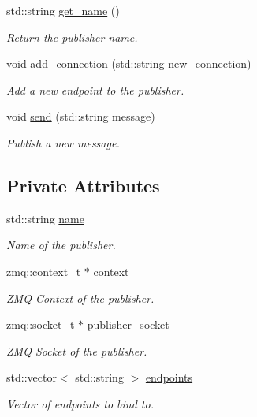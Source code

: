 \begin{DoxyCompactItemize}
std\+::string \hyperlink{classzcm_1_1Publisher_adc12b48e001014854e35141457d5c90d}{get\+\_\+name} ()
\begin{DoxyCompactList}\small\item\em Return the publisher name. \end{DoxyCompactList}\item 
void \hyperlink{classzcm_1_1Publisher_aa581fdeacd01dca767c2c1d0e3e4031f}{add\+\_\+connection} (std\+::string new\+\_\+connection)
\begin{DoxyCompactList}\small\item\em Add a new endpoint to the publisher. \end{DoxyCompactList}\item 
void \hyperlink{classzcm_1_1Publisher_a1e72bb0eef5a99fdbec0e2df957668e0}{send} (std\+::string message)
\begin{DoxyCompactList}\small\item\em Publish a new message. \end{DoxyCompactList}\end{DoxyCompactItemize}
\subsection*{Private Attributes}
\begin{DoxyCompactItemize}
\item 
std\+::string \hyperlink{classzcm_1_1Publisher_a2e3902339b55647dc6a7d2f3de64d8fe}{name}
\begin{DoxyCompactList}\small\item\em Name of the publisher. \end{DoxyCompactList}\item 
zmq\+::context\+\_\+t $\ast$ \hyperlink{classzcm_1_1Publisher_a399965216cd17f1097313f044487d968}{context}
\begin{DoxyCompactList}\small\item\em Z\+MQ Context of the publisher. \end{DoxyCompactList}\item 
zmq\+::socket\+\_\+t $\ast$ \hyperlink{classzcm_1_1Publisher_acb22f36a592a5a0beaf4100e472578d5}{publisher\+\_\+socket}
\begin{DoxyCompactList}\small\item\em Z\+MQ Socket of the publisher. \end{DoxyCompactList}\item 
std\+::vector$<$ std\+::string $>$ \hyperlink{classzcm_1_1Publisher_a34548b5f2611391263acd10cb7d197e5}{endpoints}
\begin{DoxyCompactList}\small\item\em Vector of endpoints to bind to. \end{DoxyCompactList}\end{DoxyCompactItemize}


